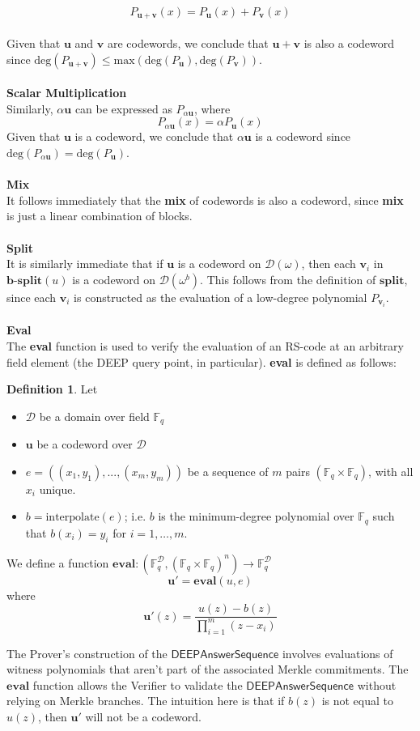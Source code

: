 \documentclass[10pt,letterpaper,titlepage]{article}
\newcommand{\GF}[1]{\mathbb{F}_{#1}}
\newcommand{\w}[0]{\omega}
\newcommand{\D}[0]{\mathcal{D}}
\theoremstyle{definition}
\newtheorem{definition}{Definition}
\begin{document}
\begin{appendices}
\[P_{\mathbf{u}+\mathbf{v}}(x)=P_\mathbf{u}(x)+P_\mathbf{v}(x)\]
\\
Given that $\mathbf{u}$ and $\mathbf{v}$ are codewords, we conclude that $\mathbf{u}+\mathbf{v}$ is also a codeword since $\text{deg}(P_{\mathbf{u}+\mathbf{v}})\leq\text{max}\left(\text{deg}(P_\mathbf{u}),\text{deg}(P_\mathbf{v})\right)$.\\
\\
\textbf{Scalar Multiplication}\\
Similarly, $\alpha \mathbf{u}$ can be expressed as $P_{\alpha \mathbf{u}}$, where
\[P_{\alpha \mathbf{u}}(x)=\alpha P_\mathbf{u}(x)\]
Given that $\mathbf{u}$ is a codeword, we conclude that $\alpha \mathbf{u}$ is a codeword since $\text{deg}(P_{\alpha \mathbf{u}})=\text{deg}(P_\mathbf{u})$. \\
\\
\textbf{Mix}\\
It follows immediately that the \textbf{mix} of codewords is also a codeword, since \textbf{mix} is just a linear combination of blocks.\\
\\
\textbf{Split}\\
It is similarly immediate that if $\mathbf{u}$ is a codeword on $\D(\w)$, then each $\mathbf{v}_i$ in $\textbf{b-split}(u)$ is a codeword on $\D(\w^b)$.
This follows from the definition of $\textbf{split}$, since each $\mathbf{v}_i$ is constructed as the evaluation of a low-degree polynomial $P_{\mathbf{v}_i}$.\\
\\
\textbf{Eval}\\
The \textbf{eval} function is used to verify the evaluation of an RS-code at an arbitrary field element (the DEEP query point, in particular). \textbf{eval} is defined as follows:
\begin{definition}
  \label{def-eval}
  Let \begin{itemize}
    \item $\D$ be a domain over field $\GF{q}$
    \item $\mathbf{u}$ be a codeword over $\D$
    \item $e =((x_1, y_1), ..., (x_m, y_m))$ be a sequence of $m$ pairs $(\GF{q} \times \GF{q})$, with all $x_i$ unique.
    \item $b=\textrm{interpolate}(e)$; i.e. $b$ is the minimum-degree polynomial over $\GF{q}$ such that $b(x_i)=y_i$ for $i=1,\ldots,m$.
  \end{itemize}
  We define a function $\textbf{eval} : (\GF{q}^{\D}, (\GF{q} \times \GF{q})^n) \rightarrow \GF{q}^{\D}$
  \[
    \mathbf{u'} = \textbf{eval}(u, e)
  \]
  where
  \[
    \mathbf{u'}(z) = \frac{u(z) - b(z)}{\prod_{i=1}^{m} (z - x_i)}
  \]
\end{definition}
\noindent
The Prover's construction of the $\mathsf{DEEPAnswerSequence}$ involves evaluations of witness polynomials that aren't part of the associated Merkle commitments.
The $\textbf{eval}$ function allows the Verifier to validate the $\mathsf{DEEPAnswerSequence}$ without relying on Merkle branches.
The intuition here is that if $b(z)$ is not equal to $u(z)$, then $\mathbf{u}'$ will not be a codeword.

\end{appendices}
\end{document}
